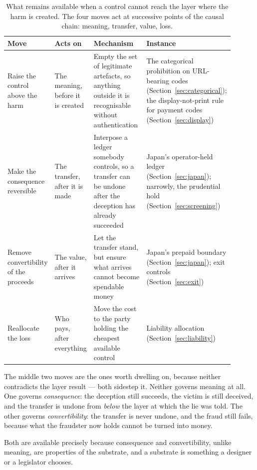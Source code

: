 \documentclass[10pt,a4paper,twocolumn]{article}
\newenvironment{widetable}{\begin{table}[t]}{\end{table}}
\newenvironment{widetable}{\begin{table}[t]}{\end{table}}
\begin{document}
\begin{widetable}
\centering
\small
\begin{tabular}{@{}p{0.17\linewidth}p{0.13\linewidth}p{0.31\linewidth}p{0.29\linewidth}@{}}
\toprule
\textbf{Move} & \textbf{Acts on} & \textbf{Mechanism} & \textbf{Instance} \\
\midrule
Raise the control above the harm &
  The meaning, before it is created &
  Empty the set of legitimate artefacts, so anything outside it is recognisable
  without authentication &
  The categorical prohibition on URL-bearing codes
  (Section~\ref{sec:categorical}); the display-not-print rule for payment codes
  (Section~\ref{sec:display}) \\[0.4em]
Make the consequence reversible &
  The transfer, after it is made &
  Interpose a ledger somebody controls, so a transfer can be undone after the
  deception has already succeeded &
  Japan's operator-held ledger (Section~\ref{sec:japan}); narrowly, the
  prudential hold (Section~\ref{sec:screening}) \\[0.4em]
Remove convertibility of the proceeds &
  The value, after it arrives &
  Let the transfer stand, but ensure what arrives cannot become spendable money &
  Japan's prepaid boundary (Section~\ref{sec:japan}); exit controls
  (Section~\ref{sec:exit}) \\[0.4em]
Reallocate the loss &
  Who pays, after everything &
  Move the cost to the party holding the cheapest available control &
  Liability allocation (Section~\ref{sec:liability}) \\
\bottomrule
\end{tabular}
\caption{What remains available when a control cannot reach the layer where the
harm is created. The four moves act at successive points of the causal chain:
meaning, transfer, value, loss.}
\label{tab:degrees}
\end{widetable}

The middle two moves are the ones worth dwelling on, because neither contradicts
the layer result --- both sidestep it. Neither governs meaning at all. One governs
\emph{consequence}: the deception still succeeds, the victim is still deceived,
and the transfer is undone from \emph{below} the layer at which the lie was
told. The other governs \emph{convertibility}: the transfer is never undone, and
the fraud still fails, because what the fraudster now holds cannot be turned
into money.

Both are available precisely because consequence and convertibility, unlike
meaning, are properties of the substrate, and a substrate is something a
designer or a legislator chooses.
\end{document}
